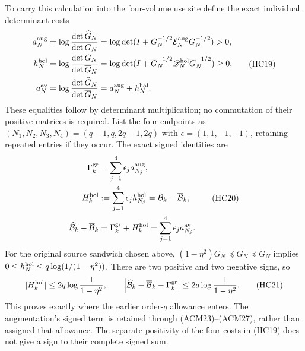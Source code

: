 To carry this calculation into the four-volume use site define
the exact individual determinant costs
\[
 \begin{aligned}
 a_N^{\rm aug}&=\log\frac{\det\widehat G_N}{\det G_N}
 =\log\det(I+G_N^{-1/2}\mathcal E_N^{\rm aug}G_N^{-1/2})>0,\\
 h_N^{\rm hol}&=\log\frac{\det G_N}{\det\overline G_N}
 =\log\det(I+\overline G_N^{-1/2}
                  \mathscr D_N^{\rm hol}\overline G_N^{-1/2})
 \geq0,\\
 a_N^{\rm av}&=\log\frac{\det\widehat G_N}{\det\overline G_N}
                    =a_N^{\rm aug}+h_N^{\rm hol}.
 \end{aligned}
 \tag{HC19}
\]
These equalities follow by determinant multiplication; no
commutation of their positive matrices is required. List the
four endpoints as $(N_1,N_2,N_3,N_4)=(q-1,q,2q-1,2q)$ with
$\epsilon=(1,1,-1,-1)$, retaining repeated entries if they
occur. The exact signed identities are
\[
 \begin{aligned}
 \Gamma_k^{\rm gr}&=\sum_{j=1}^4\epsilon_j a_{N_j}^{\rm aug},\\
 H_k^{\rm hol}&:=\sum_{j=1}^4\epsilon_j h_{N_j}^{\rm hol}
                       =\mathcal B_k-\overline{\mathcal B}_k,\\
 \widehat{\mathcal B}_k-\overline{\mathcal B}_k
 &=\Gamma_k^{\rm gr}+H_k^{\rm hol}
   =\sum_{j=1}^4\epsilon_j a_{N_j}^{\rm av}.
 \end{aligned}
 \tag{HC20}
\]
For the original source sandwich chosen above,
$(1-\eta^2)G_N\preceq\overline G_N\preceq G_N$ implies
$0\leq h_N^{\rm hol}\leq q\log(1/(1-\eta^2))$.
There are two positive and two negative signs, so
\[
 |H_k^{\rm hol}|\leq2q\log\frac1{1-\eta^2},\qquad
 \left|\widehat{\mathcal B}_k-\overline{\mathcal B}_k
                       -\Gamma_k^{\rm gr}\right|
 \leq2q\log\frac1{1-\eta^2}.
 \tag{HC21}
\]
This proves exactly where the earlier order-$q$ allowance
enters. The augmentation's signed term is retained through
(ACM23)--(ACM27), rather than assigned that allowance.
The separate positivity of the four costs in (HC19) does not
give a sign to their complete signed sum.

